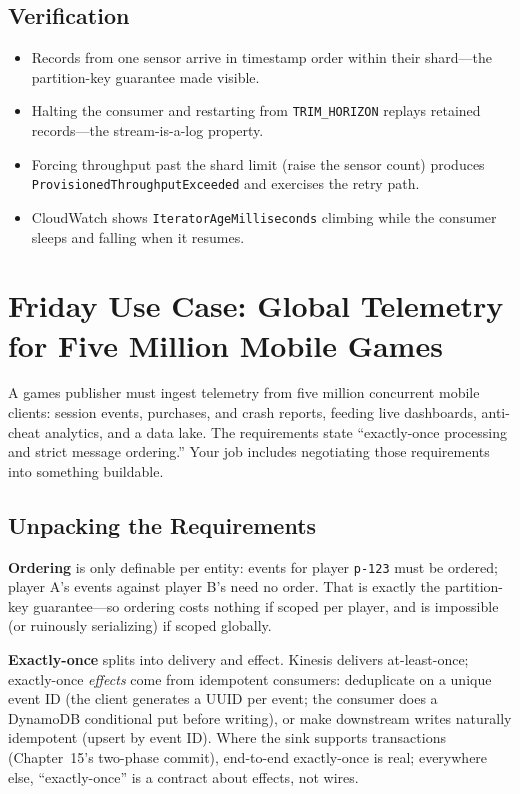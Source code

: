 \subsection*{Verification}
\begin{itemize}
    \item Records from one sensor arrive in timestamp order within their shard---the partition-key guarantee made visible.
    \item Halting the consumer and restarting from \texttt{TRIM\_HORIZON} replays retained records---the stream-is-a-log property.
    \item Forcing throughput past the shard limit (raise the sensor count) produces \texttt{ProvisionedThroughputExceeded} and exercises the retry path.
    \item CloudWatch shows \texttt{IteratorAgeMilliseconds} climbing while the consumer sleeps and falling when it resumes.
\end{itemize}

\section{Friday Use Case: Global Telemetry for Five Million Mobile Games}
A games publisher must ingest telemetry from five million concurrent mobile clients: session events, purchases, and crash reports, feeding live dashboards, anti-cheat analytics, and a data lake. The requirements state ``exactly-once processing and strict message ordering.'' Your job includes negotiating those requirements into something buildable.

\subsection{Unpacking the Requirements}
\textbf{Ordering} is only definable per entity: events for player \texttt{p-123} must be ordered; player A's events against player B's need no order. That is exactly the partition-key guarantee---so ordering costs nothing if scoped per player, and is impossible (or ruinously serializing) if scoped globally.

\textbf{Exactly-once} splits into delivery and effect. Kinesis delivers at-least-once; exactly-once \emph{effects} come from idempotent consumers: deduplicate on a unique event ID (the client generates a UUID per event; the consumer does a DynamoDB conditional put before writing), or make downstream writes naturally idempotent (upsert by event ID). Where the sink supports transactions (Chapter~15's two-phase commit), end-to-end exactly-once is real; everywhere else, ``exactly-once'' is a contract about effects, not wires.

